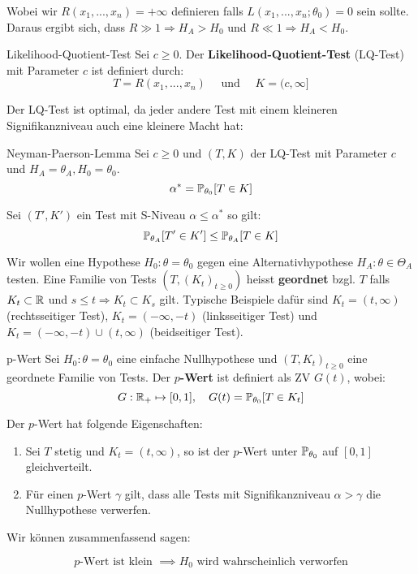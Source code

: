 Wobei wir $R(x_1,...,x_n) = + \infty$ definieren falls $L(x_1,...,x_n; \theta_0) = 0$ sein sollte. Daraus ergibt sich, dass $R \gg 1 \Rightarrow H_A > H_0$ und $R \ll 1 \Rightarrow H_A < H_0$. \smallskip

\begin{mainbox}{Likelihood-Quotient-Test} 
    Sei $c \geq 0$. Der \textbf{Likelihood-Quotient-Test} (LQ-Test) mit Parameter $c$ ist definiert durch:
    $$ T = R(x_1,...,x_n) \quad \text{ und } \quad K = (c, \infty] $$
\end{mainbox}

Der LQ-Test ist optimal, da jeder andere Test mit einem kleineren Signifikanzniveau auch eine kleinere Macht hat:

\begin{mainbox}{Neyman-Paerson-Lemma}
    Sei $c \geq 0$ und $(T,K)$ der LQ-Test mit Parameter $c$ und $H_A = \theta_A, H_0 = \theta_0$.
$$\alpha^* = \mathbb{P}_{\theta_0}[T \in K]$$

Sei $(T', K')$ ein Test mit S-Niveau $\alpha \leq \alpha^*$ so gilt:
$$\mathbb{P}_{\theta_A}[T' \in K'] \leq \mathbb{P}_{\theta_A}[T \in K]$$
\end{mainbox}


Wir wollen eine Hypothese $H_0 : \theta = \theta_0$ gegen eine Alternativhypothese $H_A : \theta \in \Theta_A$ testen. Eine Familie von Tests $(T, (K_t)_{t \geq 0})$ heisst \textbf{geordnet} bzgl. $T$ falls $K_t \subset \mathbb{R}$ und $s \leq t \Rightarrow K_t \subset K_s$ gilt. Typische Beispiele dafür sind $K_t = (t, \infty)$ (rechtsseitiger Test), $K_t = (-\infty, -t)$ (linksseitiger Test) und $K_t =  (-\infty, -t) \cup (t, \infty)$ (beidseitiger Test).

\begin{mainbox}{p-Wert}
    Sei $H_0: \theta = \theta_0$ eine einfache Nullhypothese und $(T, K_t)_{t \geq 0}$ eine geordnete Familie von Tests. Der \textbf{$p$-Wert} ist definiert als ZV $G(t)$, wobei:  
    $$G : \mathbb{R}_+ \mapsto [0,1], \quad G(t) = \mathbb{P}_{\theta_0}[T \in K_t]$$
\end{mainbox}

Der $p$-Wert hat folgende Eigenschaften:
\begin{subbox}{}
\begin{enumerate}
    \item Sei $T$ stetig und $K_t = (t, \infty)$, so ist der $p$-Wert unter $\mathbb{P}_{\theta_0}$ auf $[0,1]$ gleichverteilt.
    \item Für einen $p$-Wert $\gamma$ gilt, dass alle Tests mit Signifikanzniveau $\alpha > \gamma$ die Nullhypothese verwerfen.
\end{enumerate}
\end{subbox}

Wir können zusammenfassend sagen:
\begin{subbox}{}
    $$p\text{-Wert ist klein } \implies H_0 \text{ wird wahrscheinlich verworfen}$$
\end{subbox}

